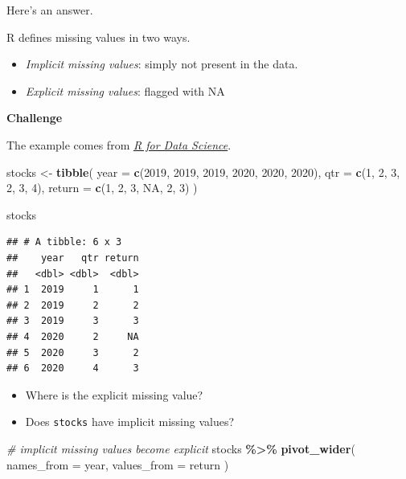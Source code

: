\documentclass[
]{book}
\newenvironment{Shaded}{\begin{snugshade}}{\end{snugshade}}
\newcommand{\AttributeTok}[1]{\textcolor[rgb]{0.13,0.29,0.53}{#1}}
\newcommand{\CommentTok}[1]{\textcolor[rgb]{0.56,0.35,0.01}{\textit{#1}}}
\newcommand{\ConstantTok}[1]{\textcolor[rgb]{0.56,0.35,0.01}{#1}}
\newcommand{\DecValTok}[1]{\textcolor[rgb]{0.00,0.00,0.81}{#1}}
\newcommand{\FunctionTok}[1]{\textcolor[rgb]{0.13,0.29,0.53}{\textbf{#1}}}
\newcommand{\NormalTok}[1]{#1}
\newcommand{\OtherTok}[1]{\textcolor[rgb]{0.56,0.35,0.01}{#1}}
\newcommand{\SpecialCharTok}[1]{\textcolor[rgb]{0.81,0.36,0.00}{\textbf{#1}}}
\begin{document}
Here's an answer.

R defines missing values in two ways.

\begin{itemize}
\item
  \emph{Implicit missing values}: simply not present in the data.
\item
  \emph{Explicit missing values}: flagged with NA
\end{itemize}

\textbf{Challenge}

The example comes from \href{https://r4ds.had.co.nz/tidy-data.html}{\emph{R for Data Science}}.

\begin{Shaded}
\begin{Highlighting}[]
\NormalTok{stocks }\OtherTok{\textless{}{-}} \FunctionTok{tibble}\NormalTok{(}
  \AttributeTok{year =} \FunctionTok{c}\NormalTok{(}\DecValTok{2019}\NormalTok{, }\DecValTok{2019}\NormalTok{, }\DecValTok{2019}\NormalTok{, }\DecValTok{2020}\NormalTok{, }\DecValTok{2020}\NormalTok{, }\DecValTok{2020}\NormalTok{),}
  \AttributeTok{qtr =} \FunctionTok{c}\NormalTok{(}\DecValTok{1}\NormalTok{, }\DecValTok{2}\NormalTok{, }\DecValTok{3}\NormalTok{, }\DecValTok{2}\NormalTok{, }\DecValTok{3}\NormalTok{, }\DecValTok{4}\NormalTok{),}
  \AttributeTok{return =} \FunctionTok{c}\NormalTok{(}\DecValTok{1}\NormalTok{, }\DecValTok{2}\NormalTok{, }\DecValTok{3}\NormalTok{, }\ConstantTok{NA}\NormalTok{, }\DecValTok{2}\NormalTok{, }\DecValTok{3}\NormalTok{)}
\NormalTok{)}

\NormalTok{stocks}
\end{Highlighting}
\end{Shaded}

\begin{verbatim}
## # A tibble: 6 x 3
##    year   qtr return
##   <dbl> <dbl>  <dbl>
## 1  2019     1      1
## 2  2019     2      2
## 3  2019     3      3
## 4  2020     2     NA
## 5  2020     3      2
## 6  2020     4      3
\end{verbatim}

\begin{itemize}
\item
  Where is the explicit missing value?
\item
  Does \texttt{stocks} have implicit missing values?
\end{itemize}

\begin{Shaded}
\begin{Highlighting}[]
\CommentTok{\# implicit missing values become explicit}
\NormalTok{stocks }\SpecialCharTok{\%\textgreater{}\%}
  \FunctionTok{pivot\_wider}\NormalTok{(}
    \AttributeTok{names\_from =}\NormalTok{ year,}
    \AttributeTok{values\_from =}\NormalTok{ return}
\NormalTok{  )}
\end{Highlighting}
\end{Shaded}
\end{document}
